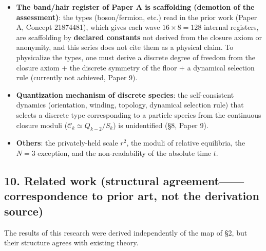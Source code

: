 \documentclass[
  a4paper,
]{ltjsarticle}
\begin{document}
\begin{itemize}
\item
  \textbf{The band/hair register of Paper A is scaffolding (demotion of
  the assessment)}: the types (boson/fermion, etc.) read in the prior
  work (Paper A, Concept 21874481), which gives each wave
  \(16\times8=128\) internal registers, are scaffolding by
  \textbf{declared constants} not derived from the closure axiom or
  anonymity, and this series does not cite them as a physical claim. To
  physicalize the types, one must derive a discrete degree of freedom
  from the closure axiom + the discrete symmetry of the floor + a
  dynamical selection rule (currently not achieved, Paper 9).
\item
  \textbf{Quantization mechanism of discrete species}: the
  self-consistent dynamics (orientation, winding, topology, dynamical
  selection rule) that selects a discrete type corresponding to a
  particle species from the continuous closure moduli
  (\(\mathcal C_k\simeq Q_{k-2}/S_k\)) is unidentified (§8, Paper 9).
\item
  \textbf{Others}: the privately-held scale \(r^2\), the moduli of
  relative equilibria, the \(N=3\) exception, and the non-readability of
  the absolute time \(t\).
\end{itemize}

\subsection{10. Related work (structural agreement------correspondence
to prior art, not the derivation
source)}\label{related-work-structural-agreementcorrespondence-to-prior-art-not-the-derivation-source}

The results of this research were derived independently of the map of
§2, but their structure agrees with existing theory.
\end{document}
